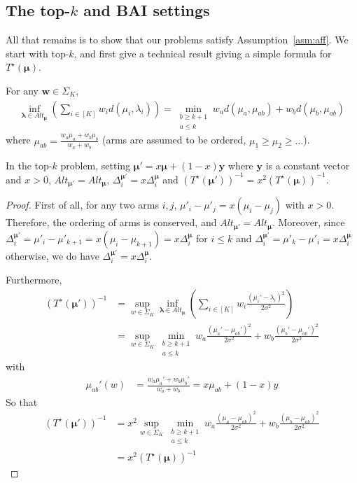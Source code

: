 \subsection{The top-$k$ and BAI settings}

All that remains is to show that our problems satisfy Assumption~\ref{asm:aff}. We start with top-$k$, and first give a technical result giving a simple formula for $T^\star(\bm\mu)$.

\begin{lemma}\label{lem:baiw}
	For any $\bm w\in \Sigma_K$, \begin{align*}\inf_{\bm\lambda \in Alt_{\bm\mu}} \left( \sum_{i\in [K]} w_i d(\mu_i,\lambda_i)\right) = \min_{\substack{b\geq k+1 \\ a\leq k}} w_a d(\mu_a,\mu_{ab})+w_b d(\mu_b,\mu_{ab})\end{align*} where $\mu_{ab}=\frac{w_a\mu_a +w_b\mu_b}{w_a+w_b}$ (arms are assumed to be ordered, $\mu_1\geq\mu_2\geq \dots$).
\end{lemma}

\begin{lemma}\label{lem:topkgoodbar}
	In the top-$k$ problem, setting $\bm\mu' = x\bm\mu + (1-x)\bm y$ where $\bm y$ is a constant vector and $x>0$, $Alt_{\bm\mu'}=Alt_{\bm\mu}$, $\Delta_i^{\bm\mu'}=x\Delta_i^{\bm\mu}$ and $(T^\star(\bm\mu'))^{-1}=x^2(T^\star(\bm\mu))^{-1}$.
\end{lemma}
\begin{proof}
	First of all, for any two arms $i,j$, $\mu'_i-\mu'_j = x(\mu_i-\mu_j)$ with $x>0$. Therefore, the ordering of arms is conserved, and $Alt_{\bm\mu'}=Alt_{\bm\mu}$. Moreover, since $\Delta_i^{\bm\mu'} = \mu'_i - \mu'_{k+1} =x(\mu_i-\mu_{k+1})=x\Delta_i^{\bm\mu}$ for $i\leq k$ and $\Delta_i^{\bm\mu'} = \mu'_k-\mu'_i=x\Delta_i^{\bm\mu}$ otherwise, we do have $\Delta_i^{\bm\mu'}=x\Delta_i^{\bm\mu}$.
	
	Furthermore,
	\begin{align*}
		(T^\star(\bm\mu'))^{-1}&= \sup_{w\in \Sigma_K}\inf_{\bm\lambda \in Alt_{\bm\mu}} \left( \sum_{i\in [K]} w_i \frac{(\mu_i'-\lambda_i)^2}{2\sigma^2}\right)\\
		&= \sup_{w\in \Sigma_K} \min_{\substack{b\geq k+1 \\ a\leq k}} w_a \frac{(\mu_a'-\mu_{ab}')^2}{2\sigma^2}+w_b \frac{(\mu_b'-\mu_{ab}')^2}{2\sigma^2}
	\end{align*} with \begin{align*}\mu_{ab}'(w)&=\frac{w_a\mu_a' +w_b\mu_b'}{w_a+w_b}=x\mu_{ab}+(1-x)y\end{align*}
	So that \begin{align*}
		(T^\star(\bm\mu'))^{-1}&=x^2\sup_{w\in \Sigma_K}\min_{\substack{b\geq k+1 \\ a\leq k}} w_a \frac{(\mu_a-\mu_{ab})^2}{2\sigma^2}+w_b \frac{(\mu_b-\mu_{ab})^2}{2\sigma^2}\\
		&=x^2(T^\star(\bm\mu))^{-1}
	\end{align*}


\end{proof}

